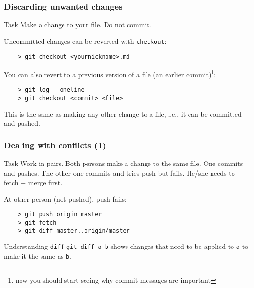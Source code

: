 
\begin{frame}[fragile]
	\frametitle{Discarding unwanted changes}
	
	\begin{block}{Task}
	Make a change to your file. Do not commit.	
	\end{block}
	
	Uncommitted changes can be reverted with \texttt{checkout}:
	\begin{verbatim}
	> git checkout <yournickname>.md
	\end{verbatim}
	
	You can also revert to a previous version of a file (an earlier commit)\footnote{now you should start seeing why commit messages are important}:
	\begin{verbatim}
	> git log --oneline
	> git checkout <commit> <file>
	\end{verbatim}
	This is the same as making any other change to a file, i.e., it can be committed and pushed.
\end{frame}


\begin{frame}[fragile]
	\frametitle{Dealing with conflicts (1)}
	
	\begin{block}{Task}
	Work in pairs. Both persons make a change to the same file. One commits and pushes. The other one commits and tries push but fails. He/she needs to fetch + merge first.	
	\end{block}
	
	At other person (not pushed), push fails:
	\begin{verbatim}
	> git push origin master
	> git fetch
	> git diff master..origin/master
	\end{verbatim}
	
	\begin{block}{Understanding \texttt{diff}}
	\texttt{git diff a b} shows changes that need to be applied to \texttt{a} to make it the same as \texttt{b}.
	\end{block}
\end{frame}

